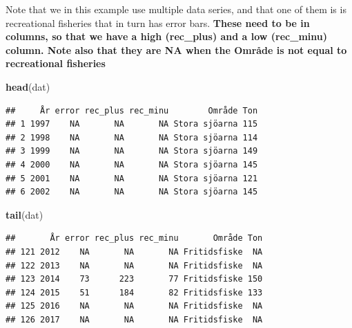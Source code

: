 \documentclass[]{article}
\newenvironment{Shaded}{\begin{snugshade}}{\end{snugshade}}
\newcommand{\KeywordTok}[1]{\textcolor[rgb]{0.13,0.29,0.53}{\textbf{#1}}}
\newcommand{\NormalTok}[1]{#1}
\begin{document}
Note that we in this example use multiple data series, and that one of
them is is recreational fisheries that in turn has error bars.
\textbf{These need to be in columns, so that we have a high (rec\_plus)
and a low (rec\_minu) column. Note also that they are NA when the Område
is not equal to recreational fisheries}

\begin{Shaded}
\begin{Highlighting}[]
\KeywordTok{head}\NormalTok{(dat) }
\end{Highlighting}
\end{Shaded}

\begin{verbatim}
##     År error rec_plus rec_minu        Område Ton
## 1 1997    NA       NA       NA Stora sjöarna 115
## 2 1998    NA       NA       NA Stora sjöarna 114
## 3 1999    NA       NA       NA Stora sjöarna 149
## 4 2000    NA       NA       NA Stora sjöarna 145
## 5 2001    NA       NA       NA Stora sjöarna 121
## 6 2002    NA       NA       NA Stora sjöarna 145
\end{verbatim}

\begin{Shaded}
\begin{Highlighting}[]
\KeywordTok{tail}\NormalTok{(dat)}
\end{Highlighting}
\end{Shaded}

\begin{verbatim}
##       År error rec_plus rec_minu       Område Ton
## 121 2012    NA       NA       NA Fritidsfiske  NA
## 122 2013    NA       NA       NA Fritidsfiske  NA
## 123 2014    73      223       77 Fritidsfiske 150
## 124 2015    51      184       82 Fritidsfiske 133
## 125 2016    NA       NA       NA Fritidsfiske  NA
## 126 2017    NA       NA       NA Fritidsfiske  NA
\end{verbatim}
\end{document}
